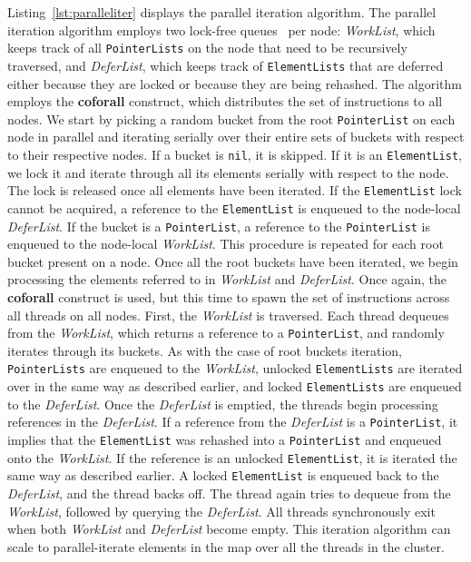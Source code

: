 \documentclass[letterpaper, 10 pt, conference]{ieeeconf}  %
\begin{document}
Listing~\ref{lst:paralleliter} displays the parallel iteration algorithm. The parallel iteration algorithm employs two lock-free queues~\cite{michaelSimpleFastPractical1996} per node: \textit{WorkList}, which keeps track of all \texttt{PointerLists} on the node that need to be recursively traversed, and \textit{DeferList}, which keeps track of \texttt{ElementLists} that are deferred either because they are locked or because they are being rehashed. The algorithm employs the \textbf{coforall} construct, which distributes the set of instructions to all nodes. We start by picking a random bucket from the root \texttt{PointerList} on each node in parallel and iterating serially over their entire sets of buckets with respect to their respective nodes. If a bucket is \texttt{nil}, it is skipped. If it is an \texttt{ElementList}, we lock it and iterate through all its elements serially with respect to the node. The lock is released once all elements have been iterated. If the \texttt{ElementList} lock cannot be acquired, a reference to the \texttt{ElementList} is enqueued to the node-local \textit{DeferList}. If the bucket is a \texttt{PointerList}, a reference to the \texttt{PointerList} is enqueued to the node-local \textit{WorkList}. This procedure is repeated for each root bucket present on a node. Once all the root buckets have been iterated, we begin processing the elements referred to in \textit{WorkList} and \textit{DeferList}. Once again, the \textbf{coforall} construct is used, but this time to spawn the set of instructions across all threads on all nodes. First, the \textit{WorkList} is traversed. Each thread dequeues from the \textit{WorkList}, which returns a reference to a \texttt{PointerList}, and randomly iterates through its buckets. As with the case of root buckets iteration, \texttt{PointerLists} are enqueued to the \textit{WorkList}, unlocked \texttt{ElementLists} are iterated over in the same way as described earlier, and locked \texttt{ElementLists} are enqueued to the \textit{DeferList}. Once the \textit{DeferList} is emptied, the threads begin processing references in the \textit{DeferList}. If a reference from the \textit{DeferList} is a \texttt{PointerList}, it implies that the \texttt{ElementList} was rehashed into a \texttt{PointerList} and enqueued onto the \textit{WorkList}. If the reference is an unlocked \texttt{ElementList}, it is iterated the same way as described earlier. A locked \texttt{ElementList} is enqueued back to the \textit{DeferList}, and the thread backs off. The thread again tries to dequeue from the \textit{WorkList}, followed by querying the \textit{DeferList}. All threads synchronously exit when both \textit{WorkList} and \textit{DeferList} become empty. This iteration algorithm can scale to parallel-iterate elements in the map over all the threads in the cluster. 
\end{document}

